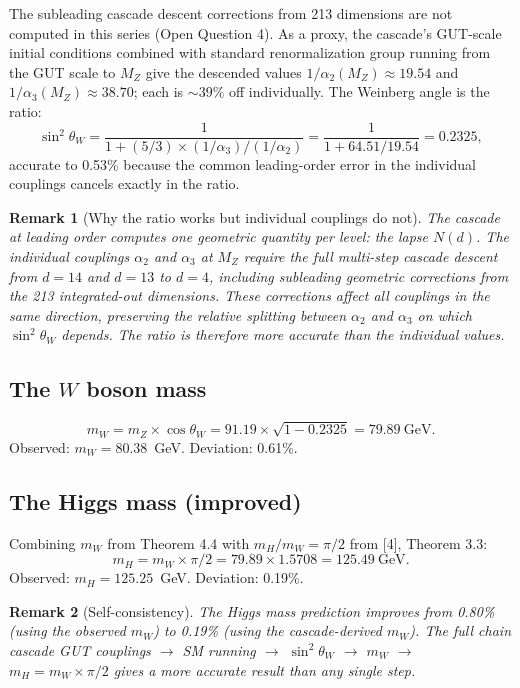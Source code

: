 \documentclass[12pt,a4paper]{article}
\newtheorem*{remark}{Remark}
\begin{document}
The subleading cascade descent corrections from 213 dimensions are not computed in this series (Open Question 4). As a proxy, the cascade's GUT-scale initial conditions combined with standard renormalization group running from the GUT scale to $M_Z$ give the descended values $1/\alpha_2(M_Z) \approx 19.54$ and $1/\alpha_3(M_Z) \approx 38.70$; each is $\sim 39\%$ off individually. The Weinberg angle is the ratio:
\[
\sin^2\theta_W = \frac{1}{1 + (5/3) \times (1/\alpha_3)/(1/\alpha_2)} = \frac{1}{1 + 64.51/19.54} = 0.2325,
\]
accurate to 0.53\% because the common leading-order error in the individual couplings cancels exactly in the ratio.

\begin{remark}[Why the ratio works but individual couplings do not]
The cascade at leading order computes one geometric quantity per level: the lapse $N(d)$. The individual couplings $\alpha_2$ and $\alpha_3$ at $M_Z$ require the full multi-step cascade descent from $d = 14$ and $d = 13$ to $d = 4$, including subleading geometric corrections from the 213 integrated-out dimensions. These corrections affect all couplings in the same direction, preserving the relative splitting between $\alpha_2$ and $\alpha_3$ on which $\sin^2\theta_W$ depends. The ratio is therefore more accurate than the individual values.
\end{remark}

\subsection{The $W$ boson mass}

\[
m_W = m_Z \times \cos\theta_W = 91.19 \times \sqrt{1 - 0.2325} = 79.89~\text{GeV}.
\]
Observed: $m_W = 80.38$~GeV. Deviation: 0.61\%.

\subsection{The Higgs mass (improved)}

Combining $m_W$ from Theorem 4.4 with $m_H/m_W = \pi/2$ from [4], Theorem 3.3:
\[
m_H = m_W \times \pi/2 = 79.89 \times 1.5708 = 125.49~\text{GeV}.
\]
Observed: $m_H = 125.25$~GeV. Deviation: 0.19\%.

\begin{remark}[Self-consistency]
The Higgs mass prediction improves from 0.80\% (using the observed $m_W$) to 0.19\% (using the cascade-derived $m_W$). The full chain cascade GUT couplings $\to$ SM running $\to$ $\sin^2\theta_W$ $\to$ $m_W$ $\to$ $m_H = m_W \times \pi/2$ gives a more accurate result than any single step.
\end{remark}
\end{document}

